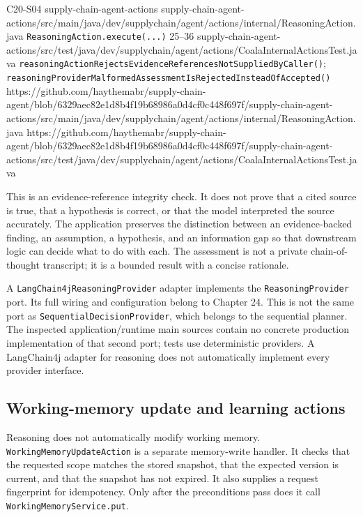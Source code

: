 \BookSourceReferenceQR
  {C20-S04}
  {supply-chain-agent-actions}
  {supply-chain-agent-actions/src/main/java/dev/supplychain/agent/actions/internal/ReasoningAction.java}
  {\texttt{ReasoningAction.execute(...)}}
  {25--36}
  {supply-chain-agent-actions/src/test/java/dev/supplychain/agent/actions/CoalaInternalActionsTest.java}
  {\texttt{reasoningActionRejectsEvidenceReferencesNotSuppliedByCaller()}; \texttt{reasoningProviderMalformedAssessmentIsRejectedInsteadOfAccepted()}}
  {https://github.com/haythemabr/supply-chain-agent/blob/6329aec82e1d8b4f19b68986a0d4cf0c448f697f/supply-chain-agent-actions/src/main/java/dev/supplychain/agent/actions/internal/ReasoningAction.java}
  {https://github.com/haythemabr/supply-chain-agent/blob/6329aec82e1d8b4f19b68986a0d4cf0c448f697f/supply-chain-agent-actions/src/test/java/dev/supplychain/agent/actions/CoalaInternalActionsTest.java}

This is an evidence-reference integrity check. It does not prove that a cited source is true, that a hypothesis is correct, or that the model interpreted the source accurately. The application preserves the distinction between an evidence-backed finding, an assumption, a hypothesis, and an information gap so that downstream logic can decide what to do with each. The assessment is not a private chain-of-thought transcript; it is a bounded result with a concise rationale.

A \texttt{LangChain4j\allowbreak ReasoningProvider} adapter implements the \texttt{Reasoning\allowbreak Provider} port. Its full wiring and configuration belong to Chapter 24. This is not the same port as \texttt{Sequential\allowbreak DecisionProvider}, which belongs to the sequential planner. The inspected application/runtime main sources contain no concrete production implementation of that second port; tests use deterministic providers. A LangChain4j adapter for reasoning does not automatically implement every provider interface.

\subsection{Working-memory update and learning actions}
\label{subsec:ch20-learning-actions}

Reasoning does not automatically modify working memory. \texttt{WorkingMemory\allowbreak UpdateAction} is a separate memory-write handler. It checks that the requested scope matches the stored snapshot, that the expected version is current, and that the snapshot has not expired. It also supplies a request fingerprint for idempotency. Only after the preconditions pass does it call \texttt{WorkingMemoryService.put}.

